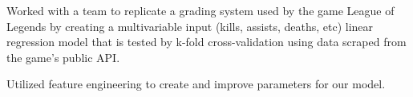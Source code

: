 \documentclass[]{deedy-resume-openfont}
\begin{document}
\begin{minipage}[t]{0.66\textwidth}



\begin{tightemize}
\item Worked with a team to replicate a grading system used by the game League of Legends by creating a multivariable input (kills, assists, deaths, etc) linear regression model that is tested by k-fold cross-validation using data scraped from the game's public API.
\item Utilized feature engineering to create and improve parameters for our model.
\end{tightemize}
\sectionsep





%

\end{minipage} 
\end{document}
